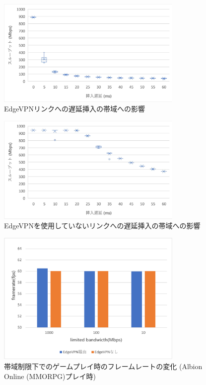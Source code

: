\begin{figure}[t]
    \centering
    \includegraphics[width=0.8\textwidth,keepaspectratio,clip]{img/bandwidth_withEdgeVPN.pdf}
    \caption{EdgeVPNリンクへの遅延挿入の帯域への影響}
    \label{fig:band_with_edge}
\end{figure}

\begin{figure}[t]
    \centering
    \includegraphics[width=0.8\textwidth,keepaspectratio,clip]{img/bandwidth_withoutEdgeVPN.pdf}
    \caption{EdgeVPNを使用していないリンクへの遅延挿入の帯域への影響}
    \label{fig:band_without_edge}
\end{figure}

\begin{figure}[t]
    \centering
    \includegraphics[width=0.8\textwidth,keepaspectratio,clip]{img/framerate_MMO.pdf}
    \caption{帯域制限下でのゲームプレイ時のフレームレートの変化 (Albion Online (MMORPG)プレイ時)}
    \label{fig:fps_mmo}
\end{figure}

